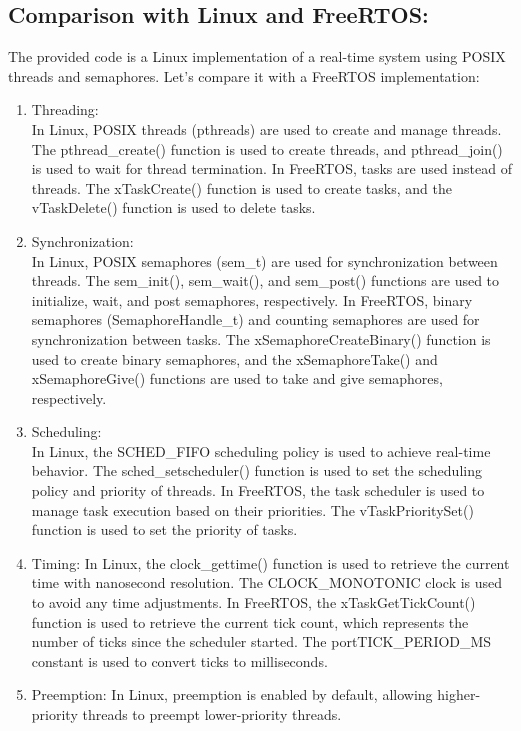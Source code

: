 \documentclass[a4paper,11pt]{article}%
\newenvironment{qanda}{\setlength{\parindent}{0pt}}{\bigskip}
\begin{document}
\begin{qanda}
\begin{enumerate}
			\subsection{Comparison with Linux and FreeRTOS:}
			The provided code is a Linux implementation of a real-time system using POSIX threads and semaphores. Let's compare it with a FreeRTOS implementation:
			\begin{enumerate}
				\item Threading:\\
				      In Linux, POSIX threads (pthreads) are used to create and manage threads. The pthread\_create() function is used to create threads, and pthread\_join() is used to wait for thread termination.
				      In FreeRTOS, tasks are used instead of threads. The xTaskCreate() function is used to create tasks, and the vTaskDelete() function is used to delete tasks.
				\item Synchronization:\\
				      In Linux, POSIX semaphores (sem\_t) are used for synchronization between threads. The sem\_init(), sem\_wait(), and sem\_post() functions are used to initialize, wait, and post semaphores, respectively.
				      In FreeRTOS, binary semaphores (SemaphoreHandle\_t) and counting semaphores are used for synchronization between tasks. The xSemaphoreCreateBinary() function is used to create binary semaphores, and the xSemaphoreTake() and xSemaphoreGive() functions are used to take and give semaphores, respectively.
				\item Scheduling:\\
				      In Linux, the SCHED\_FIFO scheduling policy is used to achieve real-time behavior. The sched\_setscheduler() function is used to set the scheduling policy and priority of threads.
				      In FreeRTOS, the task scheduler is used to manage task execution based on their priorities. The vTaskPrioritySet() function is used to set the priority of tasks.
				\item Timing:
				      In Linux, the clock\_gettime() function is used to retrieve the current time with nanosecond resolution. The CLOCK\_MONOTONIC clock is used to avoid any time adjustments.
				      In FreeRTOS, the xTaskGetTickCount() function is used to retrieve the current tick count, which represents the number of ticks since the scheduler started. The portTICK\_PERIOD\_MS constant is used to convert ticks to milliseconds.
				\item Preemption:
				      In Linux, preemption is enabled by default, allowing higher-priority threads to preempt lower-priority threads.

\end{enumerate}
\end{enumerate}
\end{qanda}
\end{document}
